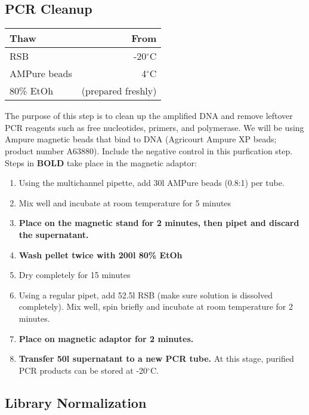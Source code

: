 \documentclass[letterpaper]{article}
\begin{document}
\subsection{PCR Cleanup}

\begin{table}[H]
\centering
\begin{tabular}{l|r}
Thaw & From \\\hline
RSB & -20$^{\circ}$C \\
AMPure beads & 4$^{\circ}$C \\
80\% EtOh & (prepared freshly) \\
\end{tabular}
\end{table}

The purpose of this step is to clean up the amplified DNA and remove leftover PCR reagents such as free nucleotides, primers, and polymerase. We will be using Ampure magnetic beads that bind to DNA (Agricourt Ampure XP beads; product number A63880). Include the negative control in this purfication step. Steps in \textbf{BOLD} take place in the magnetic adaptor:

\begin{enumerate}
\item Using the multichannel pipette, add 30\unit{}{\micro}l AMPure beads (0.8:1) per tube.
\item Mix well and incubate at room temperature for 5 minutes
\item \textbf{Place on the magnetic stand for 2 minutes, then pipet and discard the supernatant.}
\item \textbf{Wash pellet twice with 200\unit{}{\micro}l 80\% EtOh}
\item Dry completely for 15 minutes
\item Using a regular pipet, add 52.5\unit{}{\micro}l RSB (make sure solution is dissolved completely). Mix well, spin briefly and incubate at room temperature for 2 minutes.
\item \textbf{Place on magnetic adaptor for 2 minutes.}
\item \textbf{Transfer 50\unit{}{\micro}l supernatant to a new PCR tube.} At this stage, purified PCR products can be stored at -20$^{\circ}$C.
\end{enumerate}

\subsection{Library Normalization}
\end{document}
